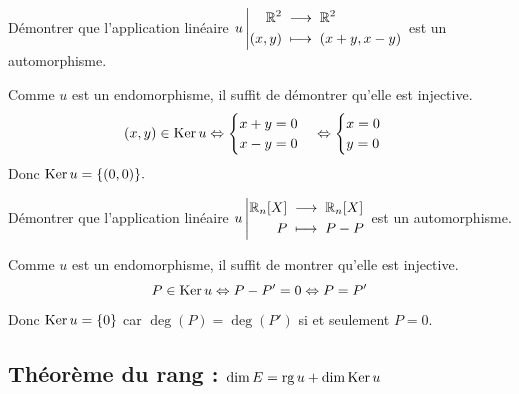 \documentclass{book}
\begin{document}
\begin{Exemple}
Démontrer que l'application linéaire ${u}\left|\begin{aligned}{\mathbb{R}^2}&\;\longrightarrow\;{\mathbb{R}^2}\\{(x,y)}&\;\longmapsto\;{ (x+y,x-y)}\end{aligned}\right.$ est un automorphisme.
\begin{Demonstration}
Comme $u$ est un endomorphisme, il suffit de démontrer qu'elle est injective.\\
$$(x,y)\in \operatorname{Ker} u \Leftrightarrow \begin{cases}x+y=0\\x-y=0\end{cases}  \Leftrightarrow  \begin{cases}x=0\\y=0\end{cases} $$ 
Donc $\operatorname{Ker} u =\{(0,0)\}.$
\end{Demonstration}
\end{Exemple}
\begin{Exemple}
Démontrer que l'application linéaire ${u}\left|\begin{aligned}{\mathbb{R}_n[X]}&\;\longrightarrow\;{\mathbb{R}_n[X]}\\{P}&\;\longmapsto\;{  P-P}\end{aligned}\right.$  est un automorphisme.
\begin{Demonstration}
Comme $u$ est un endomorphisme, il suffit de montrer qu'elle est injective.\\
$$P\in \operatorname{Ker} u \Leftrightarrow P-P'=0  \Leftrightarrow  P=P'$$ 
Donc $\operatorname{Ker} u =\{0\}$ car $\deg(P)=\deg(P')$ si et seulement $P=0$.
\end{Demonstration}
\end{Exemple}

\subsection{Théorème du rang : $\dim E = \operatorname{rg} u + \dim \operatorname{Ker} u$}
\end{document}

